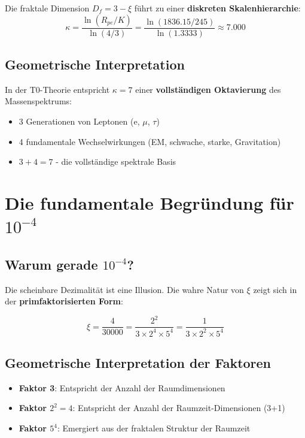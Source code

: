 	Die fraktale Dimension $D_f = 3 - \xi$ führt zu einer \textbf{diskreten Skalenhierarchie}:
	\begin{equation}
		\kappa = \frac{\ln(R_{pe}/K)}{\ln(4/3)} = \frac{\ln(1836.15/245)}{\ln(1.3333)} \approx 7.000
	\end{equation}
	
	\subsection{Geometrische Interpretation}
	
	In der T0-Theorie entspricht $\kappa = 7$ einer \textbf{vollständigen Oktavierung} des Massenspektrums:
	\begin{itemize}
		\item 3 Generationen von Leptonen (e, $\mu$, $\tau$)
		\item 4 fundamentale Wechselwirkungen (EM, schwache, starke, Gravitation)
		\item $3 + 4 = 7$ - die vollständige spektrale Basis
	\end{itemize}
	
	\section{Die fundamentale Begründung für $10^{-4}$}
	
	\subsection{Warum gerade $10^{-4}$?}
	
	Die scheinbare Dezimalität ist eine Illusion. Die wahre Natur von $\xi$ zeigt sich in der \textbf{primfaktorisierten Form}:
	
	\begin{tcolorbox}[colback=green!5!white,colframe=green!75!black,title={Fundamentale Faktorisierung}]
		\begin{equation}
			\xi = \frac{4}{30000} = \frac{2^2}{3 \times 2^4 \times 5^4} = \frac{1}{3 \times 2^2 \times 5^4}
		\end{equation}
	\end{tcolorbox}
	
	\subsection{Geometrische Interpretation der Faktoren}
	
	\begin{itemize}
		\item \textbf{Faktor 3}: Entspricht der Anzahl der Raumdimensionen
		\item \textbf{Faktor $2^2 = 4$}: Entspricht der Anzahl der Raumzeit-Dimensionen (3+1)
		\item \textbf{Faktor $5^4$}: Emergiert aus der fraktalen Struktur der Raumzeit
	\end{itemize}
	
